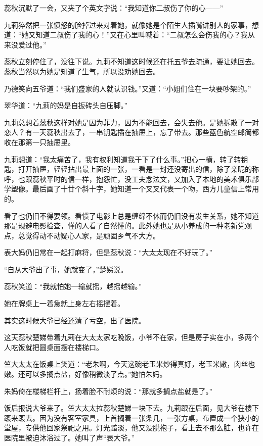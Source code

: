 \par 蕊秋沉默了一会，又夹了个英文字说：“我知道你二叔伤了你的心——”
\par 九莉猝然把一张愤怒的脸掉过来对着她，就像她是个陌生人插嘴讲别人的家事，想道：“她又知道二叔伤了我的心！”又在心里叫喊着：“二叔怎么会伤我的心？我从来没爱过他。”
\par 蕊秋立刻停住了，没往下说。九莉不知道这时候还在托五爷去疏通，要让她回去。蕊秋当然以为她是知道了生气，所以没劝她回去。
\par 乃德笑向五爷道：“我们盛家的人就认识钱。”又道：“小姐们住在一块要吵架的。”
\par 翠华道：“九莉的妈是自扳砖头自压脚。”
\par 九莉总想着蕊秋这样对她是因为菲力，因为不能回去，会失去他。是她拆散了一对恋人？有一天蕊秋出去了，一串钥匙插在抽屉上，忘了带去。那些蓝色航空邮简都收在那第一只抽屉里。
\par 九莉想道：“我太痛苦了，我有权利知道我干下了什么事。”把心一横，转了转钥匙，打开抽屉，轻轻拈出最上面的一张，一看是一封还没寄出的信，除了亲昵的称呼，也跟蕊秋平时的信一样，抱怨忙，没工夫念法文，又加入了本地的美术俱乐部学塑像。最后画了十廿个斜十字，她知道一个叉叉代表一个吻，西方儿童信上常用的。
\par 看了也仍旧不得要领。看惯了电影上总是缠绵不休而仍旧没有发生关系，她不知道那是规避电影检查，懂的人看了自然懂的。此外她也是从小养成的一种老新党观点，总觉得动不动疑心人家，是顽固乡气不大方。
\par 表大妈仍旧常在一起打麻将，但是蕊秋说：“大太太现在不好玩了。”
\par “自从大爷出了事，她就变了，”楚娣说。
\par 蕊秋笑道：“我就怕她一输就摇，越摇越输。”
\par 她在牌桌上一着急就上身左右摇摆着。
\par 其实这时候大爷已经还清了亏空，出了医院。
\par 这天蕊秋楚娣带着九莉在大太太家吃晚饭，小爷不在家，但是房子实在小，多两个人吃饭就把圆桌面摆在楼梯口。
\par 竺大太太在饭桌上笑道：“老朱啊，今天这碗老玉米炒得真好，老玉米嫩，肉丝也嫩。还可以多搁点盐，好像稍微淡了点。”她怕朱妈。
\par 朱妈倚在楼梯栏杆上，扬着脸不耐烦的说：“那就多搁点盐就是了。”
\par 饭后报说大爷来了。竺大太太拉蕊秋楚娣一块下去。九莉跟在后面，见大爷在楼下踱来踱去。因为没有客室家具，上首搁着一张条几，一张方桌，布置成一个狭小的堂屋，专供他回家祭祀之用。灯光黯淡，他又没脱袍子，看上去不那么脏，也许在医院里被迫沐浴过了。她叫了声“表大爷。”
